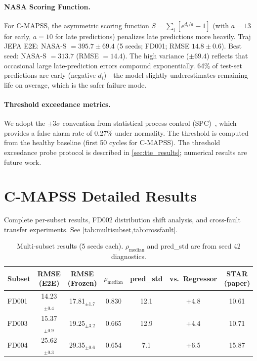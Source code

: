 \documentclass{article}
\begin{document}
\paragraph{NASA Scoring Function.}
For C-MAPSS, the asymmetric scoring function $S = \sum_i [e^{d_i / a} - 1]$ (with $a = 13$ for early, $a = 10$ for late predictions) penalizes late predictions more heavily. Traj JEPA E2E: NASA-S $= 395.7 \pm 69.4$ (5 seeds; FD001; RMSE $14.8 \pm 0.6$). Best seed: NASA-S $= 313.7$ (RMSE $= 14.4$). The high variance ($\pm 69.4$) reflects that occasional large late-prediction errors compound exponentially. 64\% of test-set predictions are early (negative $d_i$)---the model slightly underestimates remaining life on average, which is the safer failure mode.

\paragraph{Threshold exceedance metrics.}
We adopt the $\pm 3\sigma$ convention from statistical process control (SPC)~\citep{montgomery2020spc}, which provides a false alarm rate of 0.27\% under normality. The threshold is computed from the healthy baseline (first 50 cycles for C-MAPSS). The threshold exceedance probe protocol is described in \cref{sec:tte_results}; numerical results are future work.

\section{C-MAPSS Detailed Results}
\label{app:cmapss}

Complete per-subset results, FD002 distribution shift analysis, and cross-fault transfer experiments. See \cref{tab:multisubset,tab:crossfault}.

\begin{table}[h]
\centering
\caption{Multi-subset results (5 seeds each). $\rho_\text{median}$ and pred\_std are from seed 42 diagnostics.}
\label{tab:multisubset}
\small
\begin{tabular}{@{}lcccccc@{}}
\toprule
Subset & RMSE (E2E) & RMSE (Frozen) & $\rho_\text{median}$ & pred\_std & vs.\ Regressor & STAR (paper) \\
\midrule
FD001 & 14.23$_{\pm0.4}$ & 17.81$_{\pm1.7}$ & 0.830 & 12.1 & +4.8 & 10.61 \\
FD003 & 15.37$_{\pm0.9}$ & 19.25$_{\pm3.2}$ & 0.665 & 12.9 & +4.4 & 10.71 \\
FD004 & 25.62$_{\pm0.3}$ & 29.35$_{\pm0.6}$ & 0.654 & 7.1 & +6.5 & 15.87 \\
\bottomrule
\end{tabular}
\end{table}
\end{document}
